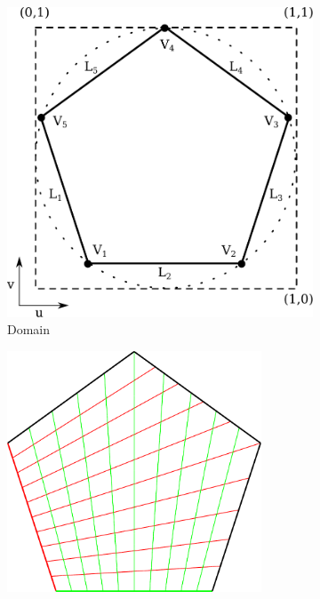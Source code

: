 \documentclass{article}
\begin{document}
\begin{figure}[b!]
  \begin{subfigure}{0.30\textwidth}
    \includegraphics[width = \textwidth]{images/domain.pdf}
    \caption{Domain}
    \label{fig:domain}
  \end{subfigure}
  \hfill
  \begin{subfigure}{0.30\textwidth}
    \begin{minipage}[b][5cm][b]{\textwidth}
      \centering
      \includegraphics[width = 0.83\textwidth]{images/s-params.pdf}

\end{minipage}
\end{subfigure}
\end{figure}
\end{document}
